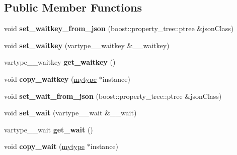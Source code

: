 \subsection*{Public Member Functions}
\begin{DoxyCompactItemize}
\item 
\mbox{\label{classfilter_1_1algos_1_1_show_image_a350bcbcf8f325f2d79229a1a2613f30e}} 
void {\bfseries set\+\_\+waitkey\+\_\+from\+\_\+json} (boost\+::property\+\_\+tree\+::ptree \&json\+Class)
\item 
\mbox{\label{classfilter_1_1algos_1_1_show_image_a0fb1461cd5e0fa4df3c245ca1dc3de75}} 
void {\bfseries set\+\_\+waitkey} (vartype\+\_\+\+\_\+waitkey \&\+\_\+\+\_\+waitkey)
\item 
\mbox{\label{classfilter_1_1algos_1_1_show_image_a43efbf1c789be5e699faf03657954603}} 
vartype\+\_\+\+\_\+waitkey {\bfseries get\+\_\+waitkey} ()
\item 
\mbox{\label{classfilter_1_1algos_1_1_show_image_aae7cd36e309625ded6dc18cc86f0bc0d}} 
void {\bfseries copy\+\_\+waitkey} (\hyperlink{classfilter_1_1algos_1_1_show_image}{mytype} $\ast$instance)
\item 
\mbox{\label{classfilter_1_1algos_1_1_show_image_a9ef16db00f259e0e59705c79aacd100c}} 
void {\bfseries set\+\_\+wait\+\_\+from\+\_\+json} (boost\+::property\+\_\+tree\+::ptree \&json\+Class)
\item 
\mbox{\label{classfilter_1_1algos_1_1_show_image_a5ac50ebb5dcadfb7f2e8e61a7232db07}} 
void {\bfseries set\+\_\+wait} (vartype\+\_\+\+\_\+wait \&\+\_\+\+\_\+wait)
\item 
\mbox{\label{classfilter_1_1algos_1_1_show_image_a93a646fc3b2d823c33653179a610802e}} 
vartype\+\_\+\+\_\+wait {\bfseries get\+\_\+wait} ()
\item 
\mbox{\label{classfilter_1_1algos_1_1_show_image_aafb288b7e3a905aedac37f171106c8ac}} 
void {\bfseries copy\+\_\+wait} (\hyperlink{classfilter_1_1algos_1_1_show_image}{mytype} $\ast$instance)

\end{DoxyCompactItemize}
